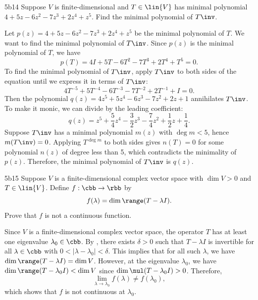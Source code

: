 \begin{exercise}{5b14}
    Suppose $V$ is finite-dimensional and $T \in \lin{V}$ has minimal polynomial $4 + 5z - 6z^2 - 7z^3 + 2z^4 + z^5$.
	Find the minimal polynomial of $T\inv$.
\end{exercise}

\begin{sol}
    Let $p(z) = 4 + 5z - 6z^2 - 7z^3 + 2z^4 + z^5$ be the minimal polynomial of $T$.
    We want to find the minimal polynomial of $T\inv$.
    Since $p(z)$ is the minimal polynomial of $T$, we have
    \[
    	p(T) = 4I + 5T - 6T^2 - 7T^3 + 2T^4 + T^5 = 0.
    \]
    To find the minimal polynomial of $T\inv$, apply $T\inv$ to both sides of the equation until we express it in terms of $T\inv$:
    \[
    	4T^{-5} + 5T^{-4} - 6T^{-3} - 7T^{-2} + 2T^{-1} + I = 0.
    \]
    Then the polynomial $q(z) = 4z^5 + 5z^4 - 6z^3 - 7z^2 + 2z + 1$ annihilates $T\inv$.
    To make it monic, we can divide by the leading coefficient:
    \[
    	q(z) = z^5 + \frac{5}{4}z^4 - \frac{3}{2}z^3 - \frac{7}{4}z^2 + \frac{1}{2}z + \frac{1}{4}.
    \]
    Suppose $T\inv$ has a minimal polynomial $m(z)$ with $\deg m < 5$, hence $m(T\inv) = 0$.
    Applying $T^{\deg m}$ to both sides gives $n(T) = 0$ for some polynomial $n(z)$ of degree less than 5, which contradicts the minimality of $p(z)$.
    Therefore, the minimal polynomial of $T\inv$ is $q(z)$.
\end{sol}

\begin{exercise}{5b15}
    Suppose $V$ is a finite-dimensional complex vector space with $\dim V > 0$ and $T \in \lin{V}$.
	Define $f: \cbb \to \rbb$ by
    \[
    	f(\lambda) = \dim \range(T - \lambda I).
    \]
    Prove that $f$ is not a continuous function.
\end{exercise}

\begin{sol}
    Since $V$ is a finite-dimensional complex vector space, the operator $T$ has at least one eigenvalue $\lambda_0 \in \cbb$.
    By , there exists $\delta > 0$ such that $T - \lambda I$ is invertible for all $\lambda \in \cbb$ with $0 < |\lambda - \lambda_0| < \delta$.
    This implies that for all such $\lambda$, we have $\dim \range(T - \lambda I) = \dim V$.
    However, at the eigenvalue $\lambda_0$, we have $\dim \range(T - \lambda_0 I) < \dim V$ since $\dim \nul(T - \lambda_0 I) > 0$.
    Therefore,
    \[
    	\lim_{\lambda \to \lambda_0} f(\lambda) \neq f(\lambda_0),
    \]
    which shows that $f$ is not continuous at $\lambda_0$.
\end{sol}


